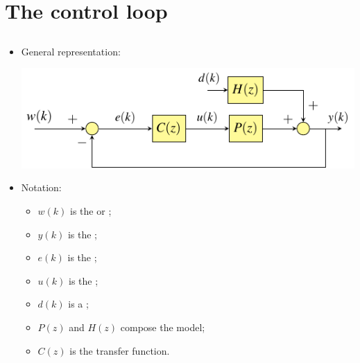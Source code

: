 \section{The control loop}
\subsection{}

\begin{frame}
\framesubtitleTC{}
\myPause
 \begin{itemize}[<+-| alert@+>]
 \item General representation:
       \begin{center}
        \includegraphics[width=0.50\columnwidth]{./Unit-04/img/ControlLoop.pdf}
       \end{center}
 \item Notation:
       \begin{itemize}[<+-| alert@+>]
       \item $w(k)$ is the  or ;
       \item $y(k)$ is the ;
       \item $e(k)$ is the ;
       \item $u(k)$ is the ;
       \item $d(k)$ is a ;
       \item $P(z)$ and $H(z)$ compose the  model;
       \item $C(z)$ is the  transfer function.
       \end{itemize}
 \end{itemize}
\end{frame}

